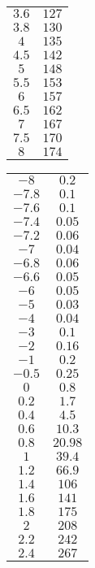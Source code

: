 \begin{center}
\begin{tabular}{c c}
\(3.6\) & \( 127\) \\ 
\(3.8\) & \( 130\) \\ 
\(4\) & \( 135\) \\ 
\(4.5\) & \( 142\) \\ 
\(5\) & \( 148\) \\ 
\(5.5\) & \( 153\) \\ 
\(6\) & \( 157\) \\ 
\(6.5\) & \( 162\) \\ 
\(7\) & \( 167\) \\ 
\(7.5\) & \( 170\) \\ 
\(8\) & \( 174\) \\
\end{tabular}
\begin{tabular}{c c}
\(-8\) & \( 0.2\) \\ 
\(-7.8\) & \( 0.1\) \\ 
\(-7.6\) & \( 0.1\) \\ 
\(-7.4\) & \( 0.05\) \\ 
\(-7.2\) & \( 0.06\) \\ 
\(-7\) & \( 0.04\) \\ 
\(-6.8\) & \( 0.06\) \\ 
\(-6.6\) & \( 0.05\) \\ 
\(-6\) & \( 0.05\) \\ 
\(-5\) & \( 0.03\) \\ 
\(-4\) & \( 0.04\) \\ 
\(-3\) & \( 0.1\) \\ 
\(-2\) & \( 0.16\) \\ 
\(-1\) & \( 0.2\) \\ 
\(-0.5\) & \( 0.25\) \\ 
\(0\) & \( 0.8\) \\ 
\(0.2\) & \( 1.7\) \\ 
\(0.4\) & \( 4.5\) \\ 
\(0.6\) & \( 10.3\) \\ 
\(0.8\) & \( 20.98\) \\ 
\(1\) & \( 39.4\) \\ 
\(1.2\) & \( 66.9\) \\ 
\(1.4\) & \( 106\) \\ 
\(1.6\) & \( 141\) \\ 
\(1.8\) & \( 175\) \\ 
\(2\) & \( 208\) \\ 
\(2.2\) & \( 242\) \\ 
\(2.4\) & \( 267\) \\ 

\end{tabular}
\end{center}
